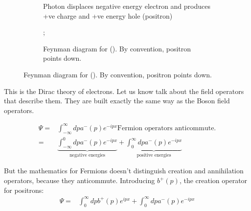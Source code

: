\documentclass[]{article}
\begin{document}
\begin{figure}[H]
	\caption{Photon hitting -ve energy electron in vacuum}
	\begin{subfigure}[t]{0.45\textwidth}
		\begin{center}
			\caption{Photon displaces negative energy electron and produces +ve charge and +ve energy hole (positron)}\label{fig:dirac:sea:photon}
		\end{center}
	\end{subfigure}
	\hfill
	\begin{subfigure}[t]{0.45\textwidth}
		\begin{center}
			\caption{Feynman diagram for (). By convention, positron points down.}\label{photon:dirac}
			;
		\end{center}
	\end{subfigure}
\end{figure}

This is the Dirac theory of electrons. Let us know talk about the field operators that describe them. They are built exactly the same way as the Boson field operators.

\begin{align*}
	\Psi =& \int_{-\infty}^{\infty} dp a^-(p) e^{-ipx} \text{Fermion operators anticommute.}\\
	=& \underbrace{\int_{-\infty}^0 dp a^-(p) e^{-ipx}}_\text{negative energies}+ \underbrace{\int_0^{\infty} dp a^-(p) e^{-ipx}}_\text{positive energies}
\end{align*}

But the mathematics for Fermions doesn't distinguish  creation and annihilation operators, because they anticommute. Introducing $b^+(p)$, the creation operator for positrons:
\begin{align*}
	\Psi =&  \int_0^{\infty} dp  b^+(p) e^{ipx}+ \int_0^{\infty} dp a^-(p) e^{-ipx}
\end{align*}
\end{document}
